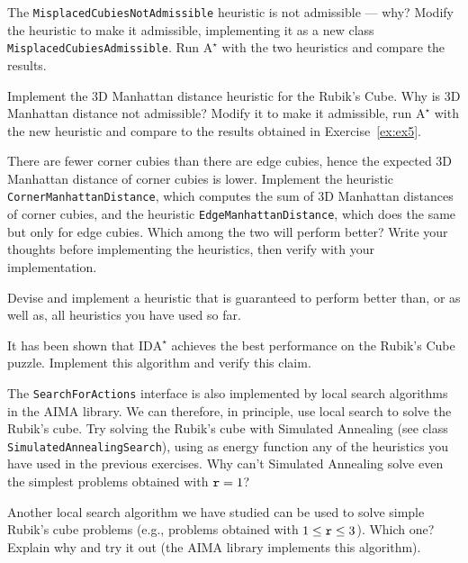 \documentclass[a4paper]{article}
\begin{document}
{\ex{}\label{ex:ex5} The {\tt MisplacedCubiesNotAdmissible} heuristic is not admissible --- why? Modify the heuristic to make it admissible, implementing it as a new class {\tt MisplacedCubiesAdmissible}. Run $\text{A}^\star$ with the two heuristics and compare the results.\vspace{0.1cm}}


{\ex{}\label{ex:ex7} Implement the 3D Manhattan distance heuristic for the Rubik's Cube.  Why is 3D Manhattan distance not admissible?  Modify it to make it admissible, run $\text{A}^\star$ with the new heuristic and compare to the results obtained in Exercise~\ref{ex:ex5}.\vspace{0.1cm}}

{\ex{}\label{ex:ex8} There are fewer corner cubies than there are edge cubies, hence the expected 3D Manhattan distance of corner cubies is lower. Implement the heuristic {\tt CornerManhattanDistance}, which computes the sum of 3D Manhattan distances of corner cubies, and the heuristic {\tt EdgeManhattanDistance}, which does the same but only for edge cubies. Which among the two will perform better?  Write your thoughts before implementing the heuristics, then verify with your implementation.\vspace{0.1cm}}

{\ex{}\label{ex:ex9} Devise and implement a heuristic that is guaranteed to perform better than, or as well as, all heuristics you have used so far.\vspace{0.1cm}}

{\ex{}\label{ex:ex10} It has been shown that $\text{IDA}^\star$ achieves the best performance on the Rubik's Cube puzzle.  Implement this algorithm and verify this claim.\vspace{0.1cm}}

{\ex{}\label{ex:ex11} The {\tt SearchForActions} interface is also implemented by local search algorithms in the AIMA library. We can therefore, in principle, use local search to solve the Rubik's cube. Try solving the Rubik's cube with Simulated Annealing (see class {\tt SimulatedAnnealingSearch}), using as energy function any of the heuristics you have used in the previous exercises. Why can't Simulated Annealing solve even the simplest problems obtained with $\text{{\tt r}} = 1$?\vspace{0.1cm}}

{\ex{}\label{ex:ex12} Another local search algorithm we have studied can be used to solve simple Rubik's cube problems (e.g., problems obtained with $1 \leq \text{{\tt r}} \leq 3$). Which one? Explain why and try it out (the AIMA library implements this algorithm).\vspace{0.1cm}}

%
%
\end{document}

